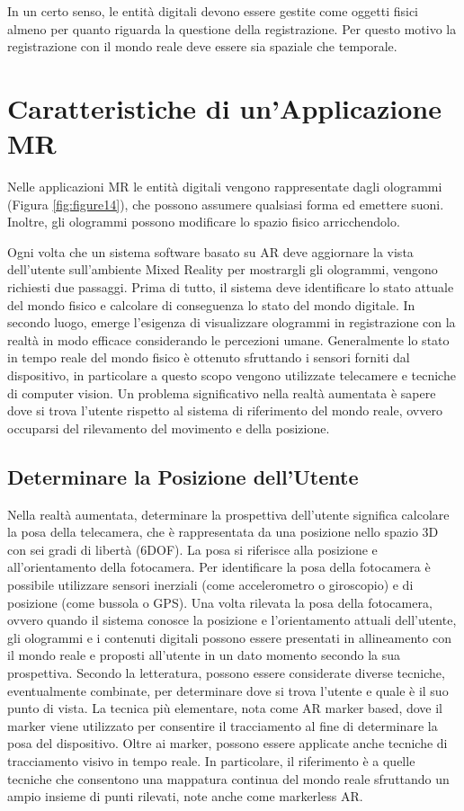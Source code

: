 In un certo senso, le entità digitali devono essere gestite come oggetti fisici almeno per quanto riguarda la questione della registrazione. Per questo motivo la registrazione con il mondo reale deve essere sia spaziale che temporale.

\section{Caratteristiche di un'Applicazione MR}\label{sec:Sezione1.3}
Nelle applicazioni MR le entità digitali vengono rappresentate dagli ologrammi (Figura \ref{fig:figure14}), che possono assumere qualsiasi forma ed emettere suoni. Inoltre, gli ologrammi possono modificare lo spazio fisico arricchendolo.

Ogni volta che un sistema software basato su AR deve aggiornare la vista dell'utente sull'ambiente Mixed Reality per mostrargli gli ologrammi, vengono richiesti due passaggi. Prima di tutto, il sistema deve identificare lo stato attuale del mondo fisico e calcolare di conseguenza lo stato del mondo digitale. In secondo luogo, emerge l'esigenza di visualizzare ologrammi in registrazione con la realtà in modo efficace considerando le percezioni umane. Generalmente lo stato in tempo reale del mondo fisico è ottenuto sfruttando i sensori forniti dal dispositivo, in particolare a questo scopo vengono utilizzate telecamere e tecniche di computer vision. Un problema significativo nella realtà aumentata è sapere dove si trova l'utente rispetto al sistema di riferimento del mondo reale, ovvero occuparsi del rilevamento del movimento e della posizione.

\subsection{Determinare la Posizione dell'Utente}
Nella realtà aumentata, determinare la prospettiva dell'utente significa calcolare la posa della telecamera, che è rappresentata da una posizione nello spazio 3D con sei gradi di libertà (6DOF). La posa si riferisce alla posizione e all'orientamento della fotocamera. Per identificare la posa della fotocamera è possibile utilizzare sensori inerziali (come accelerometro o giroscopio) e di posizione (come bussola o GPS). Una volta rilevata la posa della fotocamera, ovvero quando il sistema conosce la posizione e l'orientamento attuali dell'utente, gli ologrammi e i contenuti digitali possono essere presentati in allineamento con il mondo reale e proposti all'utente in un dato momento secondo la sua prospettiva. Secondo la letteratura, possono essere considerate diverse tecniche, eventualmente combinate, per determinare dove si trova l'utente e quale è il suo punto di vista. La tecnica più elementare, nota come AR marker based, dove il marker viene utilizzato per consentire il tracciamento al fine di determinare la posa del dispositivo. Oltre ai marker, possono essere applicate anche tecniche di tracciamento visivo in tempo reale. In particolare, il riferimento è a quelle tecniche che consentono una mappatura continua del mondo reale sfruttando un ampio insieme di punti rilevati, note anche come markerless AR.

